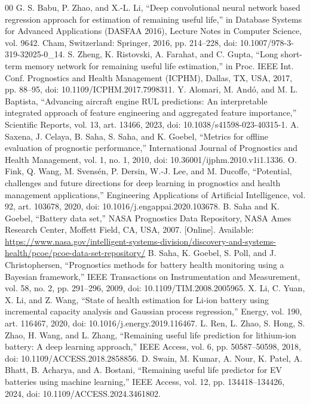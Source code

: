 \documentclass[conference]{IEEEtran}
\begin{document}
\begin{thebibliography}{00}
 G. S. Babu, P. Zhao, and X.-L. Li, ``Deep convolutional neural network based regression approach for estimation of remaining useful life,'' in Database Systems for Advanced Applications (DASFAA 2016), Lecture Notes in Computer Science, vol. 9642. Cham, Switzerland: Springer, 2016, pp. 214--228, doi: 10.1007/978-3-319-32025-0\_14.
 S. Zheng, K. Ristovski, A. Farahat, and C. Gupta, ``Long short-term memory network for remaining useful life estimation,'' in Proc. IEEE Int. Conf. Prognostics and Health Management (ICPHM), Dallas, TX, USA, 2017, pp. 88--95, doi: 10.1109/ICPHM.2017.7998311.
 Y. Alomari, M. And\'o, and M. L. Baptista, ``Advancing aircraft engine RUL predictions: An interpretable integrated approach of feature engineering and aggregated feature importance,'' Scientific Reports, vol. 13, art. 13466, 2023, doi: 10.1038/s41598-023-40315-1.
 A. Saxena, J. Celaya, B. Saha, S. Saha, and K. Goebel, ``Metrics for offline evaluation of prognostic performance,'' International Journal of Prognostics and Health Management, vol. 1, no. 1, 2010, doi: 10.36001/ijphm.2010.v1i1.1336.
 O. Fink, Q. Wang, M. Svens\'en, P. Dersin, W.-J. Lee, and M. Ducoffe, ``Potential, challenges and future directions for deep learning in prognostics and health management applications,'' Engineering Applications of Artificial Intelligence, vol. 92, art. 103678, 2020, doi: 10.1016/j.engappai.2020.103678.
 B. Saha and K. Goebel, ``Battery data set,'' NASA Prognostics Data Repository, NASA Ames Research Center, Moffett Field, CA, USA, 2007. [Online]. Available: \url{https://www.nasa.gov/intelligent-systems-division/discovery-and-systems-health/pcoe/pcoe-data-set-repository/}
 B. Saha, K. Goebel, S. Poll, and J. Christophersen, ``Prognostics methods for battery health monitoring using a Bayesian framework,'' IEEE Transactions on Instrumentation and Measurement, vol. 58, no. 2, pp. 291--296, 2009, doi: 10.1109/TIM.2008.2005965.
 X. Li, C. Yuan, X. Li, and Z. Wang, ``State of health estimation for Li-ion battery using incremental capacity analysis and Gaussian process regression,'' Energy, vol. 190, art. 116467, 2020, doi: 10.1016/j.energy.2019.116467.
 L. Ren, L. Zhao, S. Hong, S. Zhao, H. Wang, and L. Zhang, ``Remaining useful life prediction for lithium-ion battery: A deep learning approach,'' IEEE Access, vol. 6, pp. 50587--50598, 2018, doi: 10.1109/ACCESS.2018.2858856.
 D. Swain, M. Kumar, A. Nour, K. Patel, A. Bhatt, B. Acharya, and A. Bostani, ``Remaining useful life predictor for EV batteries using machine learning,'' IEEE Access, vol. 12, pp. 134418--134426, 2024, doi: 10.1109/ACCESS.2024.3461802.

\end{thebibliography}
\end{document}
